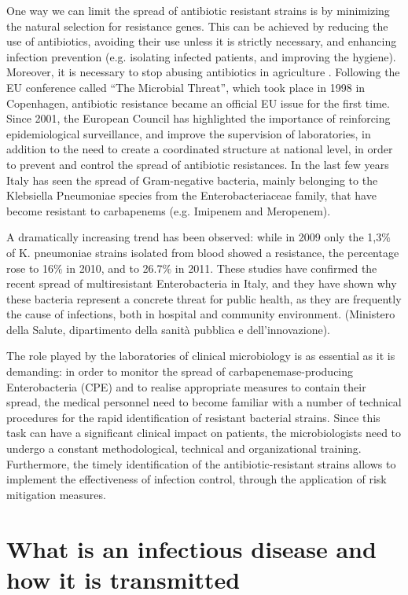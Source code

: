 \documentclass[11pt]{report}
\begin{document}
One way we can limit the spread of antibiotic resistant strains is by minimizing the natural selection for resistance genes.
This can be achieved by reducing the use of antibiotics, avoiding their use unless it is strictly necessary, and enhancing infection prevention (e.g. isolating infected patients, and improving the hygiene). Moreover, it is necessary to stop abusing antibiotics in agriculture \cite{doi:10.1093/emph/eou024} \cite{Spellberg2014}.
Following the EU conference called “The Microbial Threat”, which took place in 1998 in Copenhagen, antibiotic resistance became an official EU issue for the first time. Since 2001, the European Council has highlighted the importance of reinforcing epidemiological surveillance, and improve the supervision of laboratories, in addition to the need to create a  coordinated structure at national level, in order to prevent and control the spread of antibiotic resistances.
In the last few years Italy has seen the spread of Gram-negative bacteria, mainly belonging to the Klebsiella Pneumoniae species from the Enterobacteriaceae family, that have become resistant to carbapenems (e.g. Imipenem and Meropenem).

A dramatically increasing trend has been observed: while in 2009 only the 1,3$\%$ of K. pneumoniae strains isolated from blood showed a resistance, the percentage rose to 16$\%$ in 2010, and to 26.7$\%$ in 2011.
These studies have confirmed the recent spread of multiresistant Enterobacteria in Italy, and they have shown why these bacteria represent a concrete threat for public health, as they are frequently the cause of infections, both in hospital and community environment.
(Ministero della Salute, dipartimento della sanità pubblica e dell’innovazione).

The role played by the laboratories of clinical microbiology is as essential as it is demanding: in order to monitor the spread of carbapenemase-producing Enterobacteria (CPE) and to realise appropriate measures to contain their spread, the medical personnel need to become familiar with a number of technical procedures for the rapid identification of resistant bacterial strains. Since this task can have a significant clinical impact on patients, the microbiologists need to undergo a constant methodological, technical and organizational training. Furthermore, the timely identification of the antibiotic-resistant strains allows to implement the effectiveness of infection control, through the application of risk mitigation measures.


\section{What is an infectious disease and how it is transmitted}
\end{document}
